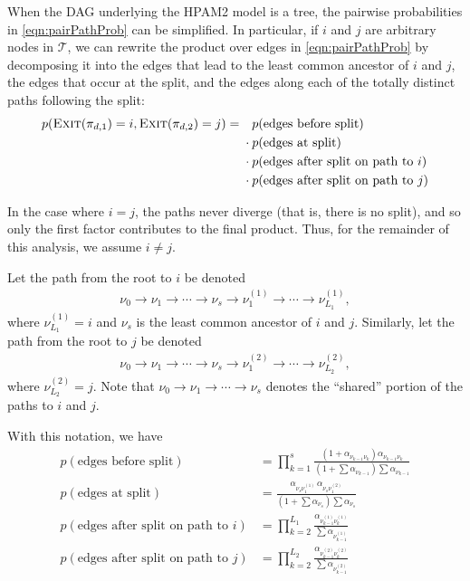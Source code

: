 \documentclass{article}
\theoremstyle{definition}
\newcommand{\Exit}{\textsc{Exit}}
\begin{document}
When the DAG underlying the HPAM2 model is a tree, the pairwise probabilities in \eqref{eqn:pairPathProb} can be simplified.
In particular, if $i$ and $j$ are arbitrary nodes in $\mathcal T$, we can rewrite the product over edges in \eqref{eqn:pairPathProb} by decomposing it into the edges that lead to the least common ancestor of $i$ and $j$, the edges that occur at the split, and the edges along each of the totally distinct paths following the split:
\begin{align}
p(\Exit(\pi_{d,1}) = i, \Exit(\pi_{d,2}) = j)
={}&
\phantom{{}\cdot{}} p(\text{edges before split}) \\
& \cdot p(\text{edges at split}) \nonumber \\
& \cdot p(\text{edges after split on path to $i$}) \nonumber \\
& \cdot p(\text{edges after split on path to $j$}) \nonumber
\end{align}

In the case where $i = j$, the paths never diverge (that is, there is no split), and so only the first factor contributes to the final product.
Thus, for the remainder of this analysis, we assume $i \neq j$.

Let the path from the root to $i$ be denoted
\begin{align}
\nu_0 \to \nu_1 \to \cdots \to \nu_s \to \nu^{(1)}_1 \to \cdots \to \nu^{(1)}_{L_1},
\end{align}
where $\nu^{(1)}_{L_1} = i$ and $\nu_s$ is the least common ancestor of $i$ and $j$.
Similarly, let the path from the root to $j$ be denoted
\begin{align}
\nu_0 \to \nu_1 \to \cdots \to \nu_s \to \nu^{(2)}_1 \to \cdots \to \nu^{(2)}_{L_2},
\end{align}
where $\nu^{(2)}_{L_2} = j$.
Note that $\nu_0 \to \nu_1 \to \cdots \to \nu_s$ denotes the ``shared'' portion of the paths to $i$ and $j$.

With this notation, we have
\begin{align}
p(\text{edges before split})
&=
\prod_{k=1}^s \frac
  {\left( 1 + \alpha_{\nu_{k-1} \nu_k} \right) \alpha_{\nu_{k-1} \nu_k} }
  {\left( 1 + \sum \alpha_{\nu_{k-1}} \right) \sum \alpha_{\nu_{k-1}} }
\\
p(\text{edges at split})
&= \frac
  {\alpha_{\nu_s \nu^{(1)}_1} \, \alpha_{\nu_s \nu^{(2)}_1}}
  { \left( 1 + \sum \alpha_{\nu_s} \right) \sum \alpha_{\nu_s} }
\\
p(\text{edges after split on path to $i$})
&=
\prod_{k=2}^{L_1} \frac
  {\alpha_{\nu^{(1)}_{k-1} \nu^{(1)}_k} }
  { \sum \alpha_{\nu^{(1)}_{k-1}} }
\label{eqn:singleFactorI}
\\
p(\text{edges after split on path to $j$})
&=
\prod_{k=2}^{L_2} \frac
  {\alpha_{\nu^{(2)}_{k-1} \nu^{(2)}_k} }
  { \sum \alpha_{\nu^{(2)}_{k-1}} }
\label{eqn:singleFactorJ}
\end{align}
\end{document}
